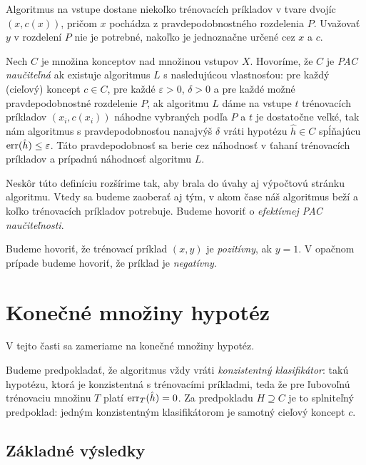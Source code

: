 Algoritmus na vstupe dostane niekoľko trénovacích príkladov v tvare dvojíc
$(x, c(x))$, pričom $x$ pochádza z pravdepodobnostného rozdelenia $P$.
Uvažovať $y$ v rozdelení $P$ nie je potrebné, nakoľko je jednoznačne
určené cez $x$ a $c$.

\begin{definition}
  Nech $C$ je množina konceptov nad množinou vstupov $X$. Hovoríme, že
  $C$ je \emph{PAC naučiteľná} ak existuje algoritmus $L$ s nasledujúcou
  vlastnosťou: pre každý (cieľový) koncept $c \in C$, pre každé
  $\varepsilon > 0$, $\delta > 0$ a pre každé možné pravdepodobnostné
  rozdelenie $P$, ak algoritmu $L$ dáme na vstupe $t$ trénovacích
  príkladov $(x_i, c(x_i))$ náhodne vybraných podľa $P$ a $t$ je
  dostatočne veľké, tak nám algoritmus s pravdepodobnosťou nanajvýš
  $\delta$ vráti hypotézu $\hat{h} \in C$ spĺňajúcu $\mathrm{err}(\hat{h}) \leq \varepsilon$.
  Táto pravdepodobnosť sa berie cez náhodnosť v ťahaní trénovacích
  príkladov a prípadnú náhodnosť algoritmu $L$.
\end{definition}
\begin{remark}
  Neskôr túto definíciu rozšírime tak, aby brala do úvahy aj výpočtovú
  stránku algoritmu. Vtedy sa budeme zaoberať aj tým, v akom čase náš
  algoritmus beží a koľko trénovacích príkladov potrebuje. Budeme
  hovoriť o \emph{efektívnej PAC naučiteľnosti}.
\end{remark}

Budeme hovoriť, že trénovací príklad $(x, y)$ je \emph{pozitívny},
ak $y = 1$. V opačnom prípade budeme hovoriť, že príklad je
\emph{negatívny}.




\section{Konečné množiny hypotéz}

V tejto časti sa zameriame na konečné množiny hypotéz.

Budeme predpokladať, že algoritmus vždy vráti \emph{konzistentný
klasifikátor}: takú hypotézu, ktorá je konzistentná s trénovacími
príkladmi, teda že pre ľubovoľnú trénovaciu množinu $T$ platí
$\mathrm{err}_T(\hat{h}) = 0$. Za predpokladu $H \supseteq C$ je to
splniteľný predpoklad: jedným konzistentným klasifikátorom je
samotný cieľový koncept $c$.



\subsection{Základné výsledky}

